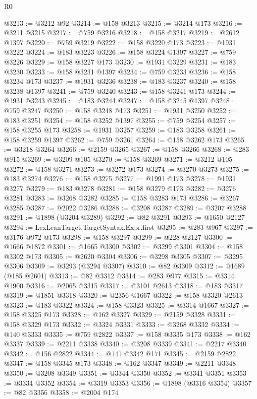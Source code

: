 \begin{lexlean}{R0}
\begin{coremodule}
@3213 := @3212 @92
@3214 := @158 @3213
@3215 := @3214 @173
@3216 := @3211 @3215
@3217 := @759 @3216
@3218 := @158 @3217
@3219 := @2612 @1397
@3220 := @759 @3219
@3222 := @158 @3220 @173
@3223 := @1931 @3222
@3224 := @183 @3223
@3226 := @158 @3224 @1397
@3227 := @759 @3226
@3229 := @158 @3227 @173
@3230 := @1931 @3229
@3231 := @183 @3230
@3233 := @158 @3231 @1397
@3234 := @759 @3233
@3236 := @158 @3234 @173
@3237 := @1931 @3236
@3238 := @183 @3237
@3240 := @158 @3238 @1397
@3241 := @759 @3240
@3243 := @158 @3241 @173
@3244 := @1931 @3243
@3245 := @183 @3244
@3247 := @158 @3245 @1397
@3248 := @759 @3247
@3250 := @158 @3248 @173
@3251 := @1931 @3250
@3252 := @183 @3251
@3254 := @158 @3252 @1397
@3255 := @759 @3254
@3257 := @158 @3255 @173
@3258 := @1931 @3257
@3259 := @183 @3258
@3261 := @158 @3259 @1397
@3262 := @759 @3261
@3264 := @158 @3262 @173
@3265 := @3218 @3264
@3266 := @2159 @3265
@3267 := @158 @3266
@3268 := @283 @915
@3269 := @3209 @105
@3270 := @158 @3269
@3271 := @3212 @105
@3272 := @158 @3271
@3273 := @3272 @173
@3274 := @3270 @3273
@3275 := @183 @3274
@3276 := @158 @3275
@3277 := @1991 @173
@3278 := @1931 @3277
@3279 := @183 @3278
@3281 := @158 @3279 @173
@3282 := @3276 @3281
@3283 := @3268 @3282
@3285 := @158 @3283 @173
@3286 := @3267 @3285
@3287 := @2022 @3286
@3288 := @3208 @3287
@3289 := @3207 @3288
@3291 := @1898 (@3204 @3289)
@3292 := @82 @3291
@3293 := @1650 @2127
@3294 := LexLeanTarget.TargetSyntax.Expr.first
@3295 := @283 @967
@3297 := @3176 @972 @173
@3298 := @158 @3297
@3299 := @228 @2127
@3300 := @1666 @1872
@3301 := @1665 @3300
@3302 := @3299 @3301
@3304 := @158 @3302 @173
@3305 := @2620 @3304
@3306 := @3298 @3305
@3307 := @3295 @3306
@3309 := @3293 (@3294 @3307)
@3310 := @82 @3309
@3312 := @1689 (@185 @2601)
@3313 := @82 @3312
@3314 := @283 @977
@3315 := @3314 @1900
@3316 := @2065 @3315
@3317 := @3101 @2613
@3318 := @183 @3317
@3319 := @1851 @3318
@3320 := @2356 @1667
@3322 := @158 @3320 @2613
@3323 := @183 @3322
@3324 := @158 @3323
@3325 := @3314 @1667
@3327 := @158 @3325 @173
@3328 := @162 @3327
@3329 := @2159 @3328
@3331 := @158 @3329 @173
@3332 := @3324 @3331
@3333 := @3268 @3332
@3334 := @140 @3333
@3335 := @759 @2822
@3337 := @158 @3335 @173
@3338 := @162 @3337
@3339 := @2211 @3338
@3340 := @3208 @3339
@3341 := @2217 @3340
@3342 := @156 @2822
@3344 := @141 @3342 @171
@3345 := @2159 @2822
@3347 := @158 @3345 @173
@3348 := @162 @3347
@3349 := @2211 @3348
@3350 := @3208 @3349
@3351 := @3344 @3350
@3352 := @3341 @3351
@3353 := @3334 @3352
@3354 := @3319 @3353
@3356 := @1898 (@3316 @3354)
@3357 := @82 @3356
@3358 := @2004 @174

\end{coremodule}
\end{lexlean}
